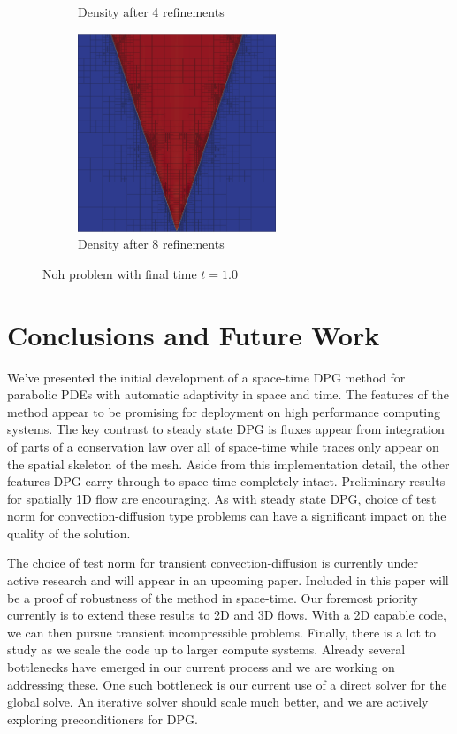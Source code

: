 \documentclass[preprint,12pt]{elsarticle}
\begin{document}
\begin{figure}[p]
\begin{subfigure}[c]{0.45\textwidth}
\caption{Density after 4 refinements}
\label{fig:noh_mesh4}
\end{subfigure}
\begin{subfigure}[c]{0.9\textwidth}
\centering
\includegraphics[width=0.65\textwidth]{SpaceTimeCNS/Noh1e-3/mesh9.png}
\caption{Density after 8 refinements}
\label{fig:noh_mesh8}
\end{subfigure}
\caption{Noh problem with final time $t=1.0$}
\label{fig:noh}
\end{figure}

\section{Conclusions and Future Work}
We've presented the initial development of a space-time DPG method for parabolic PDEs with automatic adaptivity in space and time.
The features of the method appear to be promising for deployment on high performance computing systems.
The key contrast to steady state DPG is fluxes appear from integration of parts of a conservation law over all of space-time while 
traces only appear on the spatial skeleton of the mesh.
Aside from this implementation detail, the other features DPG carry through to space-time completely intact.
Preliminary results for spatially 1D flow are encouraging.
As with steady state DPG, choice of test norm for convection-diffusion type problems can have a significant impact on the quality of the solution.

The choice of test norm for transient convection-diffusion is currently under active research and will appear in an upcoming paper.
Included in this paper will be a proof of robustness of the method in space-time.
Our foremost priority currently is to extend these results to 2D and 3D flows.
With a 2D capable code, we can then pursue transient incompressible problems.
Finally, there is a lot to study as we scale the code up to larger compute systems.
Already several bottlenecks have emerged in our current process and we are working on addressing these.
One such bottleneck is our current use of a direct solver for the global solve. 
An iterative solver should scale much better, and we are actively exploring preconditioners for DPG.
\end{document}
